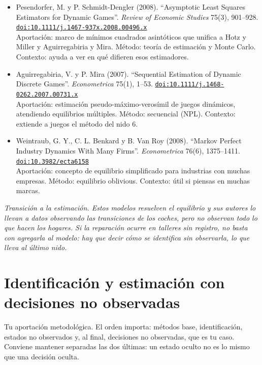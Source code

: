 \documentclass[11pt]{article}
\begin{document}
\begin{itemize}
\item Pesendorfer, M. y P. Schmidt-Dengler (2008). ``Asymptotic Least Squares Estimators for Dynamic Games''. \textit{Review of Economic Studies} 75(3), 901--928. \href{https://doi.org/10.1111/j.1467-937x.2008.00496.x}{\texttt{doi:10.1111/j.1467-937x.2008.00496.x}}\\
Aportación: marco de mínimos cuadrados asintóticos que unifica a Hotz y Miller y Aguirregabiria y Mira. Método: teoría de estimación y Monte Carlo. Contexto: ayuda a ver en qué difieren esos estimadores.
\item Aguirregabiria, V. y P. Mira (2007). ``Sequential Estimation of Dynamic Discrete Games''. \textit{Econometrica} 75(1), 1--53. \href{https://doi.org/10.1111/j.1468-0262.2007.00731.x}{\texttt{doi:10.1111/j.1468-0262.2007.00731.x}}\\
Aportación: estimación pseudo-máximo-verosímil de juegos dinámicos, atendiendo equilibrios múltiples. Método: secuencial (NPL). Contexto: extiende a juegos el método del nido 6.
\item Weintraub, G. Y., C. L. Benkard y B. Van Roy (2008). ``Markov Perfect Industry Dynamics With Many Firms''. \textit{Econometrica} 76(6), 1375--1411. \href{https://doi.org/10.3982/ecta6158}{\texttt{doi:10.3982/ecta6158}}\\
Aportación: concepto de equilibrio simplificado para industrias con muchas empresas. Método: equilibrio oblivious. Contexto: útil si piensas en muchas marcas.
\end{itemize}

\medskip
\noindent\textit{Transición a la estimación. Estos modelos resuelven el equilibrio y sus autores lo llevan a datos observando las transiciones de los coches, pero no observan todo lo que hacen los hogares. Si la reparación ocurre en talleres sin registro, no basta con agregarla al modelo: hay que decir cómo se identifica sin observarla, lo que lleva al último nido.}

\section{Identificación y estimación con decisiones no observadas}
Tu aportación metodológica. El orden importa: métodos base, identificación, estados no observados y, al final, decisiones no observadas, que es tu caso. Conviene mantener separadas las dos últimas: un estado oculto no es lo mismo que una decisión oculta.
\end{document}
